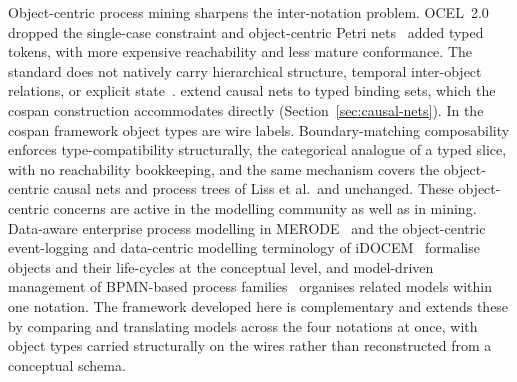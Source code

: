 Object-centric process mining sharpens the inter-notation problem.
OCEL~2.0~\cite{bertiOCELObjectCentricEvent2024} dropped the single-case constraint and object-centric Petri
nets~\cite{vanderaalstDiscoveringObjectCentricPetri2020} added typed tokens, with more
expensive reachability and less mature conformance. The standard does not natively carry
hierarchical structure, temporal inter-object relations, or explicit
state~\cite{khayatbashiAdvancingObjectcentricProcess2026,bertiStateAwareObjectCentricProcess2025}.
\citet{lissObjectCentricCausalNets2025} extend causal nets to typed binding sets, which
the cospan construction accommodates directly (Section~\ref{sec:causal-nets}). In the cospan
framework object types are wire labels. Boundary-matching composability enforces type-compatibility
structurally, the categorical analogue of a typed slice, with no reachability bookkeeping, and the
same mechanism covers the object-centric causal nets and process trees of Liss et al.\ and
\citet{vandettenDiscoveringCompactLive2024} unchanged. These object-centric
concerns are active in the modelling community as well as in mining. Data-aware enterprise process
modelling in MERODE~\cite{snoeckSupportingDataawareProcesses2023} and the object-centric
event-logging and data-centric modelling terminology of
iDOCEM~\cite{verbruggenIDOCEMDefiningCommon2024} formalise objects and their life-cycles at the
conceptual level, and model-driven management of BPMN-based process
families~\cite{delgadoModeldrivenManagementBPMNbased2022} organises related models within one
notation. The framework developed here is complementary and extends these by comparing and
translating models across the four notations at once, with object types carried structurally on the
wires rather than reconstructed from a conceptual schema.
